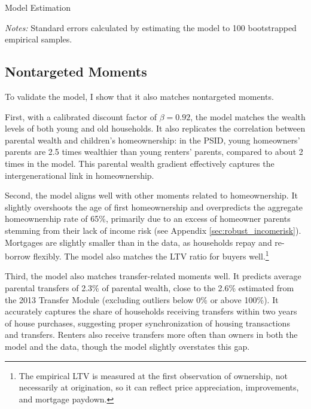 \documentclass[12pt]{article}
\begin{document}
\begin{table}[tb]
	\center 
	\begin{threeparttable}
	\caption{Model Estimation}\label{tab:esttable}
		
	\end{threeparttable}
	{\begin{footnotesize}\begin{flushleft}\vspace{-0.1in}
		\textit{Notes:} Standard errors calculated by estimating the model to 100 bootstrapped empirical samples.
		\end{flushleft}\end{footnotesize}}
\end{table}
\subsection{Nontargeted Moments}\label{sec:externalval}
To validate the model, I show that it also matches nontargeted moments. 

First, with a calibrated discount factor of $\beta=0.92$, the model matches the wealth levels of both young and old households. It also replicates the correlation between parental wealth and children's homeownership: in the PSID, young homeowners' parents are 2.5 times wealthier than young renters' parents, compared to about 2 times in the model. This parental wealth gradient effectively captures the intergenerational link in homeownership.

Second, the model aligns well with other moments related to homeownership. It slightly overshoots the age of first homeownership and overpredicts the aggregate homeownership rate of 65\%, primarily due to an excess of homeowner parents stemming from their lack of income risk (see Appendix \ref{sec:robust_incomerisk}). Mortgages are slightly smaller than in the data, as households repay and re-borrow flexibly. The model also matches the LTV ratio for buyers well.\footnote{The empirical LTV is measured at the first observation of ownership, not necessarily at origination, so it can reflect price appreciation, improvements, and mortgage paydown.}

Third, the model also matches transfer-related moments well. It predicts average parental transfers of 2.3\% of parental wealth, close to the 2.6\% estimated from the 2013 Transfer Module (excluding outliers below 0\% or above 100\%). It accurately captures the share of households receiving transfers within two years of house purchases, suggesting proper synchronization of housing transactions and transfers. Renters also receive transfers more often than owners in both the model and the data, though the model slightly overstates this gap.
\end{document}
